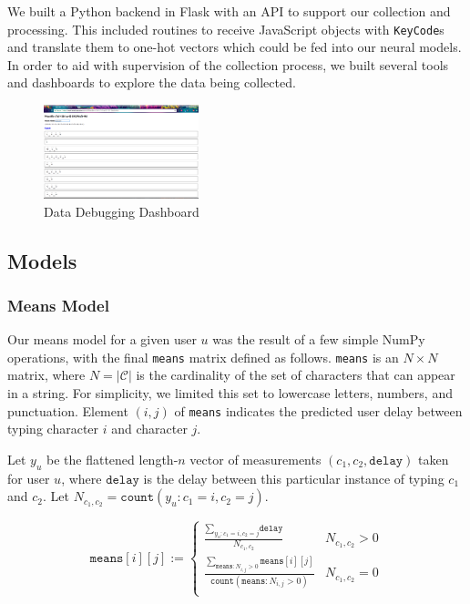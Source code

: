 \documentclass[9pt,journal]{IEEEtran}
\begin{document}
We built a Python backend in Flask with an API to support our collection and processing. This included routines to receive JavaScript objects with \texttt{KeyCode}s and translate them to one-hot vectors which could be fed into our neural models. In order to aid with supervision of the collection process, we built several tools and dashboards to explore the data being collected.

\begin{figure}[H]
  \centering
  \includegraphics[width=0.4\textwidth]{admin}
  \caption{Data Debugging Dashboard}
\end{figure}

\subsection{Models}
\subsubsection{Means Model}
Our means model for a given user $u$ was the result of a few simple NumPy operations, with the final \texttt{means} matrix defined as follows. \texttt{means} is an $N \times N$ matrix, where $N = |\mathcal{C}|$ is the cardinality of the set of characters that can appear in a string. For simplicity, we limited this set to lowercase letters, numbers, and punctuation. Element $(i, j)$ of \texttt{means} indicates the predicted user delay between typing character $i$ and character $j$.

Let $y_u$ be the flattened length-$n$ vector of measurements $(c_1, c_2, \texttt{delay})$ taken for user $u$, where $\texttt{delay}$ is the delay between this particular instance of typing $c_1$ and $c_2$. Let $N_{c_1, c_2} = \texttt{count}(y_u : c_1 = i, c_2 = j)$.

\[ \texttt{means}[i][j] :=
  \begin{cases}
      \frac{\sum_{y_u : c_1 = i, c_2 = j}{\texttt{delay}}}{N_{c_1, c_2}} & N_{c_1, c_2} > 0 \\
      \frac{\sum_{\texttt{means} : N_{i, j} > 0}{\texttt{means}[i][j]}}{\texttt{count}(\texttt{means} : N_{i, j} > 0)} & N_{c_1, c_2} = 0 \\
   \end{cases}
\]
\end{document}
